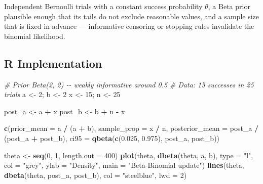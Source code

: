 \documentclass[
]{article}
\newenvironment{Shaded}{\begin{snugshade}}{\end{snugshade}}
\newcommand{\AttributeTok}[1]{\textcolor[rgb]{0.13,0.29,0.53}{#1}}
\newcommand{\CommentTok}[1]{\textcolor[rgb]{0.56,0.35,0.01}{\textit{#1}}}
\newcommand{\DecValTok}[1]{\textcolor[rgb]{0.00,0.00,0.81}{#1}}
\newcommand{\FloatTok}[1]{\textcolor[rgb]{0.00,0.00,0.81}{#1}}
\newcommand{\FunctionTok}[1]{\textcolor[rgb]{0.13,0.29,0.53}{\textbf{#1}}}
\newcommand{\NormalTok}[1]{#1}
\newcommand{\OtherTok}[1]{\textcolor[rgb]{0.56,0.35,0.01}{#1}}
\newcommand{\SpecialCharTok}[1]{\textcolor[rgb]{0.81,0.36,0.00}{\textbf{#1}}}
\newcommand{\StringTok}[1]{\textcolor[rgb]{0.31,0.60,0.02}{#1}}
\begin{document}
Independent Bernoulli trials with a constant success probability
\(\theta\), a Beta prior plausible enough that its tails do not exclude
reasonable values, and a sample size that is fixed in advance ---
informative censoring or stopping rules invalidate the binomial
likelihood.

\subsection{R Implementation}\label{r-implementation}

\begin{Shaded}
\begin{Highlighting}[]
\CommentTok{\# Prior Beta(2, 2) {-}{-} weakly informative around 0.5}
\CommentTok{\# Data: 15 successes in 25 trials}
\NormalTok{a }\OtherTok{\textless{}{-}} \DecValTok{2}\NormalTok{; b }\OtherTok{\textless{}{-}} \DecValTok{2}
\NormalTok{x }\OtherTok{\textless{}{-}} \DecValTok{15}\NormalTok{; n }\OtherTok{\textless{}{-}} \DecValTok{25}

\NormalTok{post\_a }\OtherTok{\textless{}{-}}\NormalTok{ a }\SpecialCharTok{+}\NormalTok{ x}
\NormalTok{post\_b }\OtherTok{\textless{}{-}}\NormalTok{ b }\SpecialCharTok{+}\NormalTok{ n }\SpecialCharTok{{-}}\NormalTok{ x}

\FunctionTok{c}\NormalTok{(}\AttributeTok{prior\_mean =}\NormalTok{ a }\SpecialCharTok{/}\NormalTok{ (a }\SpecialCharTok{+}\NormalTok{ b),}
  \AttributeTok{sample\_prop =}\NormalTok{ x }\SpecialCharTok{/}\NormalTok{ n,}
  \AttributeTok{posterior\_mean =}\NormalTok{ post\_a }\SpecialCharTok{/}\NormalTok{ (post\_a }\SpecialCharTok{+}\NormalTok{ post\_b),}
  \AttributeTok{ci95 =} \FunctionTok{qbeta}\NormalTok{(}\FunctionTok{c}\NormalTok{(}\FloatTok{0.025}\NormalTok{, }\FloatTok{0.975}\NormalTok{), post\_a, post\_b))}

\NormalTok{theta }\OtherTok{\textless{}{-}} \FunctionTok{seq}\NormalTok{(}\DecValTok{0}\NormalTok{, }\DecValTok{1}\NormalTok{, }\AttributeTok{length.out =} \DecValTok{400}\NormalTok{)}
\FunctionTok{plot}\NormalTok{(theta, }\FunctionTok{dbeta}\NormalTok{(theta, a, b), }\AttributeTok{type =} \StringTok{"l"}\NormalTok{, }\AttributeTok{col =} \StringTok{"grey"}\NormalTok{,}
     \AttributeTok{ylab =} \StringTok{"Density"}\NormalTok{, }\AttributeTok{main =} \StringTok{"Beta{-}Binomial update"}\NormalTok{)}
\FunctionTok{lines}\NormalTok{(theta, }\FunctionTok{dbeta}\NormalTok{(theta, post\_a, post\_b), }\AttributeTok{col =} \StringTok{"steelblue"}\NormalTok{, }\AttributeTok{lwd =} \DecValTok{2}\NormalTok{)}
\end{Highlighting}
\end{Shaded}
\end{document}
